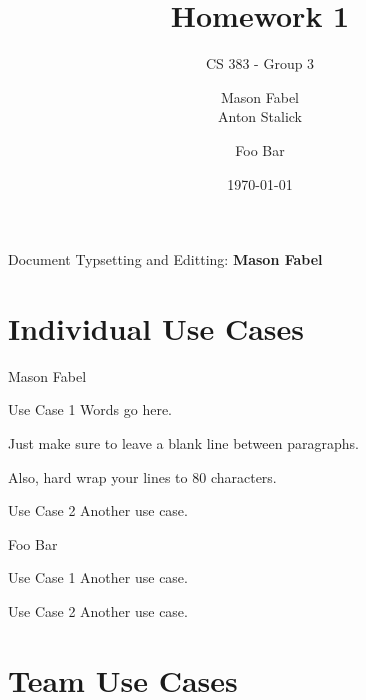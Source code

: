 \documentclass[12pt]{report}
\title{Homework 1}
\subtitle{CS 383 - Group 3}
\author{
Mason Fabel \\
Anton Stalick \\
\and Foo Bar
}
\date{\today}
\begin{document}
\maketitle

\tableofcontents
Document Typsetting and Editting: \textbf{Mason Fabel}
\clearpage

\chapter{Individual Use Cases}





\begin{section}{Mason Fabel}
\begin{subsection}{Use Case 1}
Words go here.

Just make sure to leave a blank line between paragraphs.

Also, hard wrap your lines to 80 characters.
\end{subsection}

\begin{subsection}{Use Case 2}
Another use case.
\end{subsection}
\end{section}

\begin{section}{Foo Bar}
\begin{subsection}{Use Case 1}
Another use case.
\end{subsection}

\begin{subsection}{Use Case 2}
Another use case.
\end{subsection}
\end{section}

\chapter{Team Use Cases}

\end{document}
